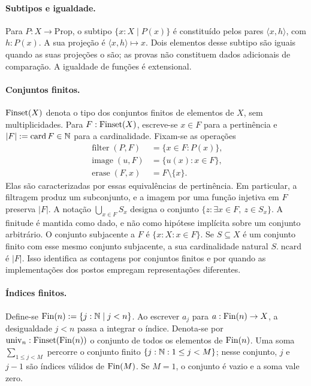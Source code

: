\paragraph{Subtipos e igualdade.}
Para $P:X\to\mathrm{Prop}$, o subtipo
$\{x:X\mid P(x)\}$ é constituído pelos pares $\langle x,h\rangle$, com $h:P(x)$.
A sua projeção é $\langle x,h\rangle\mapsto x$. Dois elementos desse subtipo
são iguais quando as suas projeções o são; as provas não constituem
dados adicionais de comparação. A igualdade de funções é extensional.

\paragraph{Conjuntos finitos.}
$\operatorname{Finset}(X)$ denota o tipo dos conjuntos finitos de elementos de $X$, sem
multiplicidades. Para $F:\operatorname{Finset}(X)$, escreve-se $x\in F$ para a pertinência e
$|F|:=\operatorname{card} F\in\mathbb N$ para a cardinalidade. Fixam-se as operações
\begin{align*}
 \operatorname{filter}(P,F)&=\{x\in F:P(x)\},\\
 \operatorname{image}(u,F)&=\{u(x):x\in F\},\\
 \operatorname{erase}(F,x)&=F\setminus\{x\}.
\end{align*}
Elas são caracterizadas por essas equivalências de pertinência. Em
particular, a filtragem produz um subconjunto, e a imagem por uma função
injetiva em $F$ preserva $|F|$. A notação $\bigcup_{x\in F}S_x$ designa o
conjunto $\{z:\exists x\in F,\ z\in S_x\}$. A finitude é mantida como dado,
e não como hipótese implícita sobre um conjunto arbitrário.
O conjunto subjacente a $F$ é $\{x:X:x\in F\}$.
Se $S\subseteq X$ é um conjunto finito com esse mesmo conjunto
subjacente, a sua cardinalidade natural $S.\operatorname{ncard}$ é $|F|$.
Isso identifica as contagens por conjuntos finitos e por 
quando as implementações dos postos empregam representações diferentes.

\paragraph{Índices finitos.}
Define-se $\operatorname{Fin}(n):=\{j:\mathbb N\mid j<n\}$. Ao escrever $a_j$ para
$a:\operatorname{Fin}(n)\to X$, a desigualdade $j<n$ passa a integrar o índice.
Denota-se por $\operatorname{univ}_n:\operatorname{Finset}(\operatorname{Fin}(n))$ o conjunto de todos
os elementos de $\operatorname{Fin}(n)$. Uma soma $\sum_{1\le j<M}$ percorre o conjunto finito
$\{j:\mathbb N:1\le j<M\}$; nesse conjunto, $j$ e $j-1$ são índices válidos de
$\operatorname{Fin}(M)$. Se $M=1$, o conjunto é vazio e a soma vale zero.

